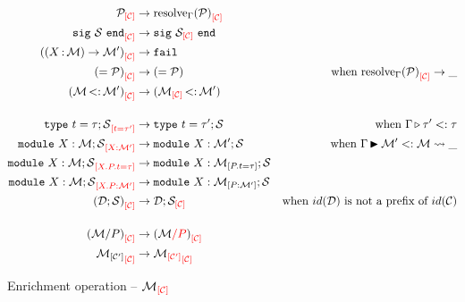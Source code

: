 \begin{align*}
  \Oenrich{\iC}{\iP}
  &\to \Oenrich{\iC}{\resolve{\E}{\iP}}\\
  \Oenrich{\iC}{\Ssig{\iS}}
  &\to \Ssig{\Oenrich{\iC}{\iS}}\\
  \Oenrich{\iC}{(\Sfunctor{\ix}{\iM}{\iM'})}
  &\to \texttt{fail}\\
  \Oenrich{\iC}{\Salias{\iP}}
  &\to \Salias{\iP} &\text{when } \Oenrich{\iC}{\resolve{\E}{\iP}}\to \_\\
  \Oenrich{\iC}{\Stransp{\iM}{\iM'}}
  &\to \Stransp{\Oenrich{\iC}{\iM}}{\iM'}\\[4mm]
  \Oenrich{t = \tau'}{\Stype{t}{\tau};\iS}
  &\to \Stype{t}{\tau'};\iS
  &\text{when } \subtyp{\E}{\tau'}{\tau}\\
  \Oenrich{\ix : \iM'}{\Smodulety{\ix}{\iM};\iS}
  &\to \Smodulety{\ix}{\iM'};\iS
  &\text{when } \submod{\E}{\iM'}{\iM}{\_}\\
  \Oenrich{\ix.\ip.t = \tau}{\Smodulety{\ix}{\iM};\iS}
  &\to \Smodulety{\ix}{\Senrich{\ip.t = \tau}{\iM}};\iS\\
  \Oenrich{\ix.\ip : \iM'}{\Smodulety{\ix}{\iM};\iS}
  &\to \Smodulety{\ix}{\Senrich{\ip : \iM'}{\iM}};\iS\\
  \Oenrich{\iC}{(\iD;\iS)}
  &\to \iD;\Oenrich{\iC}{\iS}
  &\text{when } id(\iD) \text{ is not a prefix of } id(\iC)\\[4mm]
  \Oenrich{\iC}{(\Sstrengthen{l}{\ip}{\iM})}
  &\to \Oenrich{\iC}{(\Ostrengthen{l}{\ip}{\iM})}\\
  \Oenrich{\iC}{\Senrich{\iC'}{\iM}}
  &\to \Oenrich{\iC}{\Oenrich{\iC'}{\iM}}\\
\end{align*}\vspace{-3mm}
\caption{Enrichment operation -- $\Oenrich{\iC}{\iM}$}
\label{module:enrich}


